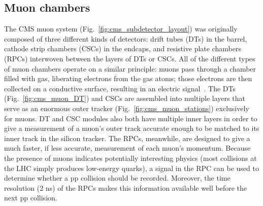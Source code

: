 \subsection{Muon chambers}
The CMS muon system (Fig.~\ref{fig:cms_subdetector_layout}) was originally composed of three different kinds of detectors: drift tubes (DTs) in the barrel, cathode strip chambers (CSCs) in the endcaps, and resistive plate chambers (RPCs) interwoven between the layers of DTs or CSCs. 
All of the different types of muon chambers operate on a similar principle: muons pass through a chamber filled with gas, liberating electrons from the gas atoms; those electrons are then collected on a conductive surface, resulting in an electric signal~\cite{CERN-LHCC-97-032}. 
The DTs (Fig.~\ref{fig:cms_muon_DT}) and CSCs are assembled into multiple layers that serve as an enormous outer tracker (Fig.~\ref{fig:cms_muon_stations}) exclusively for muons. 
DT and CSC modules also both have multiple inner layers in order to give a measurement of a muon's outer track accurate enough to be matched to its inner track in the silicon tracker. 
The RPCs, meanwhile, are designed to give a much faster, if less accurate, measurement of each muon's momentum. 
Because the presence of muons indicates potentially interesting physics (most collisions at the LHC simply produces low-energy quarks), a signal in the RPC can be used to determine whether a pp collision should be recorded.
Moreover, the time resolution (2 ns) of the RPCs makes this information available well before the next pp collision.

